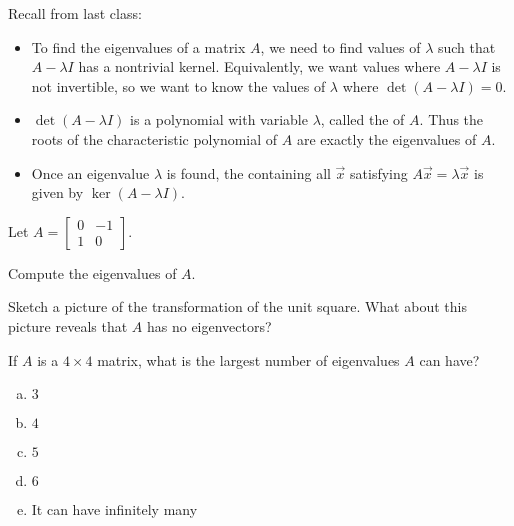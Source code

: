
\begin{applicationActivities}{4}{28}


\begin{observation}
Recall from last class:
\begin{itemize}
\item To find the eigenvalues of a matrix $A$, we need to find values of $\lambda$ such that $A-\lambda I$ has a nontrivial kernel. Equivalently,
we want values where $A-\lambda I$ is not invertible, so we want to know
the values of \(\lambda\) where $\det(A-\lambda I)=0$.
\item $\det(A-\lambda I)$ is a polynomial with variable \(\lambda\),
called the  of $A$. Thus the roots of
the characteristic polynomial of \(A\) are exactly the eigenvalues of \(A\).
\item Once an eigenvalue \(\lambda\) is found, the 
containing all  \(\vec x\) satisfying
\(A\vec x=\lambda\vec x\) is given by $\ker(A-\lambda I)$.
\end{itemize}
\end{observation}

\begin{activity}{5}
Let  $A=\begin{bmatrix}0 & -1 \\ 1 & 0 \end{bmatrix}$.
  \begin{subactivity}
    Compute the eigenvalues of $A$.
  \end{subactivity}
  \begin{subactivity}
     Sketch a picture of the transformation of the unit square.
     What about this picture reveals that \(A\) has no eigenvectors?
   \end{subactivity}
\end{activity}

\begin{activity}{5}
  If $A$ is a $4 \times 4$ matrix, what is the largest number of eigenvalues $A$ can have?
  \begin{enumerate}[(a)]
  \item $3$
  \item $4$
  \item $5$
  \item $6$
  \item It can have infinitely many
  \end{enumerate}
\end{activity}


\end{applicationActivities}
